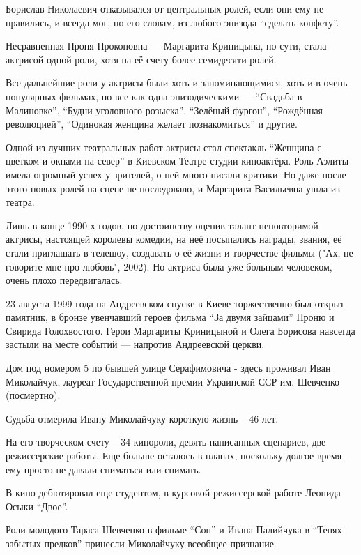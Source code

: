 \begin{multicols}{2}
Борислав Николаевич отказывался от центральных ролей, если они ему не
нравились, и всегда мог, по его словам, из любого эпизода \enquote{сделать конфету}.

Несравненная Проня Прокоповна — Маргарита Криницына, по сути, стала актрисой
одной роли, хотя на её счету более семидесяти ролей.

Все дальнейшие роли у актрисы были хоть и запоминающимися, хоть и в очень
популярных фильмах, но все как одна эпизодическими — \enquote{Свадьба в Малиновке},
\enquote{Будни уголовного розыска}, \enquote{Зелёный фургон}, \enquote{Рождённая революцией}, \enquote{Одинокая
женщина желает познакомиться} и другие.

Одной из лучших театральных работ актрисы стал спектакль \enquote{Женщина с цветком и
окнами на север} в Киевском Театре-студии киноактёра. Роль Аэлиты имела
огромный успех у зрителей, о ней много писали критики. Но даже после этого
новых ролей на сцене не последовало, и Маргарита Васильевна ушла из театра.

Лишь в конце 1990-х годов, по достоинству оценив талант неповторимой актрисы,
настоящей королевы комедии, на неё посыпались награды, звания, её стали
приглашать в телешоу, создавать о её жизни и творчестве фильмы ("Ах, не
говорите мне про любовь", 2002). Но актриса была уже больным человеком, очень
плохо передвигалась.

23 августа 1999 года на Андреевском спуске в Киеве торжественно был открыт
памятник, в бронзе увенчавший героев фильма \enquote{За двумя зайцами} Проню и Свирида
Голохвостого. Герои Маргариты Криницыной и Олега Борисова навсегда застыли на
месте событий — напротив Андреевской церкви.

Дом под номером 5 по бывшей улице Серафимовича - здесь проживал Иван
Миколайчук, лауреат Государственной премии Украинской ССР им. Шевченко
(посмертно).

Судьба отмерила Ивану Миколайчуку короткую жизнь – 46 лет.

На его творческом счету – 34 кинороли, девять написанных сценариев, две
режиссерские работы. Еще больше осталось в планах, поскольку долгое время ему
просто не давали сниматься или снимать. 

В кино дебютировал еще студентом, в курсовой режиссерской работе Леонида Осыки
\enquote{Двое}.

Роли молодого Тараса Шевченко в фильме \enquote{Сон} и Ивана Палийчука в \enquote{Тенях забытых
предков} принесли Миколайчуку всеобщее признание.


\end{multicols}
